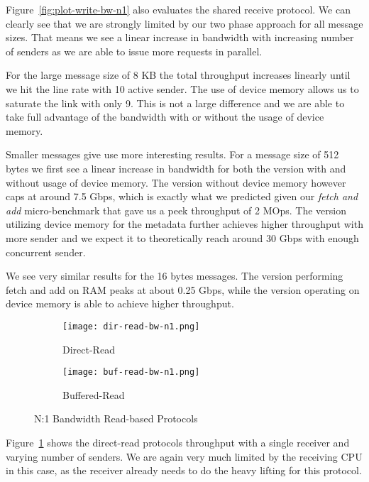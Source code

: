 Figure~\ref{fig:plot-write-bw-n1} also evaluates the shared receive protocol. We can clearly see that we are strongly limited
by our two phase approach for all message sizes. That means we see a linear increase in bandwidth with increasing number of 
senders as we are able to issue more requests in parallel.

For the large message size of 8 KB the total throughput increases linearly until we hit the line rate with 10 
active sender. The use of device memory allows us to saturate the link with only 9. This is not a large difference and we are
able to take full advantage of the bandwidth with or without the usage of device memory.

Smaller messages give use more interesting results. For a message size of 512 bytes we first see a linear 
increase in bandwidth for both the version with and without usage of device memory. The version without device memory however
caps at around 7.5 Gbps, which is exactly what we predicted given our \emph{fetch and add} micro-benchmark that gave us a
peek throughput of 2 MOps. The version utilizing device memory for the metadata further achieves higher throughput with more
sender and we expect it to theoretically reach around 30 Gbps with enough concurrent sender.

We see very similar results for the 16 bytes messages. The version performing fetch and add on RAM peaks at about 0.25 Gbps, 
while the version operating on device memory is able to achieve higher throughput.



\begin{figure}[ht]
  \begin{subfigure}[b]{0.49\textwidth}
  \centering
  \texttt{[image: dir-read-bw-n1.png]}
  \caption{Direct-Read}
  \label{fig:plot-dirread-bw-n1}
  \end{subfigure}
  \begin{subfigure}[b]{0.49\textwidth}
  \centering
  \texttt{[image: buf-read-bw-n1.png]}
  \caption{Buffered-Read}
  \label{fig:plot-bufread-bw-n1}
  \end{subfigure}
  \caption{N:1 Bandwidth Read-based Protocols}
\end{figure}

Figure~\ref{fig:plot-dirread-bw-n1} shows the direct-read protocols throughput with a single receiver and varying number of senders.
We are again very much limited by the receiving CPU in this case, as the receiver already needs to do the heavy lifting for 
this protocol. 

